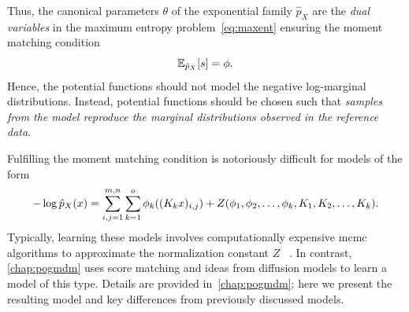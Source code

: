 Thus, the canonical parameters \( \theta \) of the exponential family \( \hat{p}_X \) are the \emph{dual variables} in the maximum entropy problem~\eqref{eq:maxent} ensuring the moment matching condition
\begin{equation}
	\mathbb{E}_{\hat{p}_X}[s] = \phi.
\end{equation}
Hence, the potential functions should not model the negative log-marginal distributions.
Instead, potential functions should be chosen such that \emph{samples from the model reproduce the marginal distributions observed in the reference data}.

Fulfilling the moment matching condition is notoriously difficult for models of the form
\begin{equation}
	- \log \hat{p}_X(x) = \sum_{i,j=\num{1}}^{m, n} \sum_{k=\num{1}}^{o} \phi_k((K_k x)_{i, j}) + Z(\phi_{\num{1}},\phi_{\num{2}},\dotsc,\phi_k, K_{\num{1}}, K_{\num{2}}, \dotsc, K_k).
\end{equation}
Typically, learning these models involves computationally expensive \gls{mcmc} algorithms to approximate the normalization constant \( Z \) ~\cite{RoBl09,zhu_prior_1997,zhu_minimax_1997,zhu_filters_1998}.
In contrast, \cref{chap:pogmdm} uses score matching and ideas from diffusion models to learn a model of this type.
Details are provided in~\cref{chap:pogmdm}; here we present the resulting model and key differences from previously discussed models.

